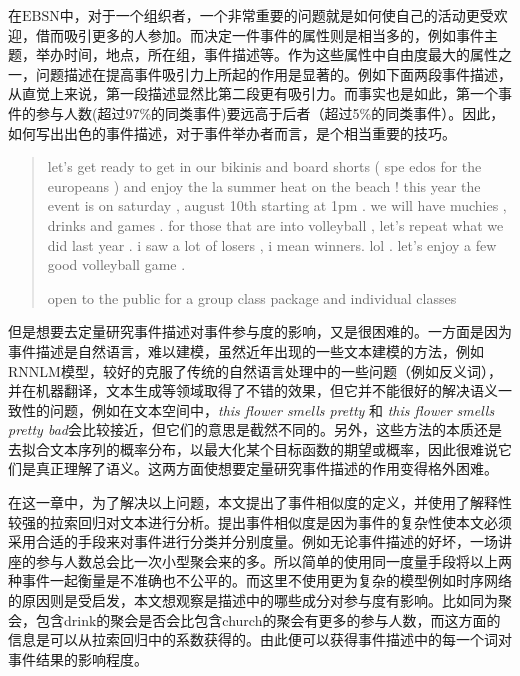 % 
在$\mathrm{EBSN}$中，对于一个组织者，一个非常重要的问题就是如何使自己的活动更受欢迎，借而吸引更多的人参加。而决定一件事件的属性则是相当多的，例如事件主题，举办时间，地点，所在组，事件描述等。作为这些属性中自由度最大的属性之一，问题描述在提高事件吸引力上所起的作用是显著的。例如下面两段事件描述，从直觉上来说，第一段描述显然比第二段更有吸引力。而事实也是如此，第一个事件的参与人数(超过97\%的同类事件)要远高于后者（超过5\%的同类事件）。因此，如何写出出色的事件描述，对于事件举办者而言，是个相当重要的技巧。

\begin{quotation}
let's get ready to get in our bikinis and board shorts  (  spe
  edos for the europeans  )  and enjoy the la summer heat on the beach
  !  this year the event is on saturday  ,  august 10th starting at 
  1pm . we will have muchies  ,  drinks and games . for those that 
  are into volleyball  ,  let's repeat what we did last year . 
  i saw a lot of losers  ,  i mean winners. lol . let's enjoy 
  a few good volleyball game .

  open to the public for a group class package and individual classes
\end{quotation}

但是想要去定量研究事件描述对事件参与度的影响，又是很困难的。一方面是因为事件描述是自然语言，难以建模，虽然近年出现的一些文本建模的方法，例如RNNLM模型，较好的克服了传统的自然语言处理中的一些问题（例如反义词），并在机器翻译，文本生成等领域取得了不错的效果，但它并不能很好的解决语义一致性的问题，例如在文本空间中，\textit{this flower smells pretty} 和 \textit{this flower smells pretty bad}会比较接近，但它们的意思是截然不同的。另外，这些方法的本质还是去拟合文本序列的概率分布，以最大化某个目标函数的期望或概率，因此很难说它们是真正理解了语义。这两方面使想要定量研究事件描述的作用变得格外困难。

在这一章中，为了解决以上问题，本文提出了事件相似度的定义，并使用了解释性较强的拉索回归对文本进行分析。提出事件相似度是因为事件的复杂性使本文必须采用合适的手段来对事件进行分类并分别度量。例如无论事件描述的好坏，一场讲座的参与人数总会比一次小型聚会来的多。所以简单的使用同一度量手段将以上两种事件一起衡量是不准确也不公平的。而这里不使用更为复杂的模型例如时序网络的原因则是受启发，本文想观察是描述中的哪些成分对参与度有影响。比如同为聚会，包含drink的聚会是否会比包含church的聚会有更多的参与人数，而这方面的信息是可以从拉索回归中的系数获得的。由此便可以获得事件描述中的每一个词对事件结果的影响程度。

